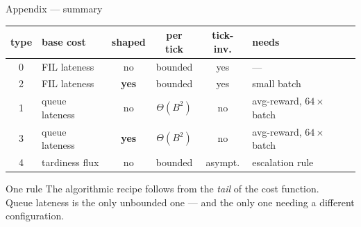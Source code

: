 \documentclass[12pt,aspectratio=169]{beamer}
\newcommand{\good}[1]{\textbf{#1}}
\begin{document}
\begin{frame}{Appendix --- summary}

\begin{center}
\small
\begin{tabular}{clcccl}
\toprule
\textbf{type} & \textbf{base cost} & \textbf{shaped} & \textbf{per tick} &
\textbf{tick-inv.} & \textbf{needs} \\
\midrule
0 & FIL lateness   & no  & bounded          & yes  & --- \\
2 & FIL lateness   & \good{yes} & bounded   & yes  & small batch \\
1 & queue lateness & no  & $\Theta(B^2)$    & no   & avg-reward, $64\times$ batch \\
3 & queue lateness & \good{yes} & $\Theta(B^2)$ & no & avg-reward, $64\times$ batch \\
4 & tardiness flux & no  & bounded          & asympt. & escalation rule \\
\bottomrule
\end{tabular}
\end{center}

\vfill
\begin{block}{One rule}
\centering
The algorithmic recipe follows from the \emph{tail} of the cost function. \\[2pt]
Queue lateness is the only unbounded one --- and the only one needing a
different configuration.
\end{block}

\end{frame}
\end{document}
